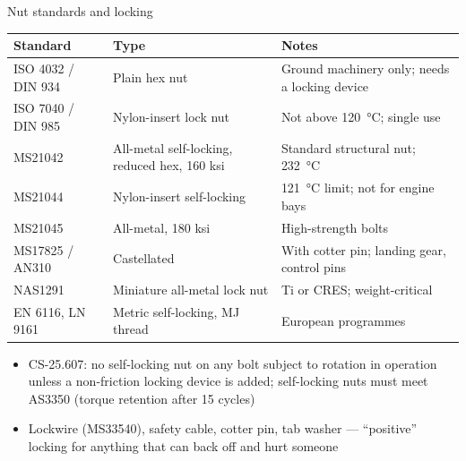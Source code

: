 \documentclass[aspectratio=169,10pt]{beamer}
\begin{document}
\begin{frame}{Nut standards and locking}
\scriptsize
\begin{tabular}{@{}p{2.6cm}p{4.6cm}p{6.4cm}@{}}
\toprule
Standard & Type & Notes \\
\midrule
ISO 4032 / DIN 934 & Plain hex nut & Ground machinery only; needs a locking device \\
ISO 7040 / DIN 985 & Nylon-insert lock nut & Not above \SI{120}{\celsius}; single use \\
MS21042 & All-metal self-locking, reduced hex, 160 ksi & Standard structural nut; \SI{232}{\celsius} \\
MS21044 & Nylon-insert self-locking & \SI{121}{\celsius} limit; not for engine bays \\
MS21045 & All-metal, 180 ksi & High-strength bolts \\
MS17825 / AN310 & Castellated & With cotter pin; landing gear, control pins \\
NAS1291 & Miniature all-metal lock nut & Ti or CRES; weight-critical \\
EN 6116, LN 9161 & Metric self-locking, MJ thread & European programmes \\
\bottomrule
\end{tabular}
\vspace{4pt}
\begin{itemize}
  \item CS-25.607: no self-locking nut on any bolt subject to rotation in operation unless a non-friction locking device is added; self-locking nuts must meet AS3350 (torque retention after 15 cycles)
  \item Lockwire (MS33540), safety cable, cotter pin, tab washer --- ``positive'' locking for anything that can back off and hurt someone
\end{itemize}
\end{frame}
\end{document}
